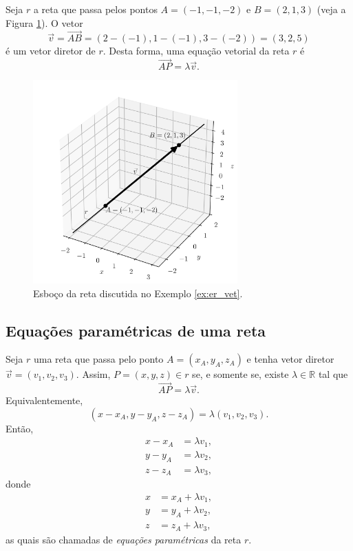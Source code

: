 \begin{ex}\label{ex:er_vet}
  Seja $r$ a reta que passa pelos pontos $A=(-1,-1,-2)$ e $B = (2,1,3)$ (veja a Figura \ref{fig:ex_er_vet}). O vetor
  \begin{equation}
    \vec{v} = \overrightarrow{AB} = (2-(-1),1-(-1),3-(-2)) = (3,2,5)
  \end{equation}
  é um vetor diretor de $r$. Desta forma, uma equação vetorial da reta $r$ é
  \begin{equation}
    \overrightarrow{AP} = \lambda\vec{v}.
  \end{equation}
  \begin{figure}[H]
    \centering
    \includegraphics[width=0.7\textwidth]{./cap_er/dados/fig_ex_er_vet/fig_ex_er_vet}
    \caption{Esboço da reta discutida no Exemplo \ref{ex:er_vet}.}
    \label{fig:ex_er_vet}
  \end{figure}  
\end{ex}

\subsection{Equações paramétricas de uma reta}

Seja $r$ uma reta que passa pelo ponto $A = (x_A,y_A,z_A)$ e tenha vetor diretor $\vec{v} = (v_1,v_2,v_3)$. Assim, $P = (x,y,z)\in r$ se, e somente se, existe $\lambda\in\mathbb{R}$ tal que
\begin{equation}
  \overrightarrow{AP} = \lambda\vec{v}.
\end{equation}
Equivalentemente,
\begin{equation}
  (x-x_A,y-y_A,z-z_A) = \lambda (v_1,v_2,v_3).
\end{equation}
Então,
\begin{align}
  x-x_A &= \lambda v_1,\\
  y-y_A &= \lambda v_2,\\
  z-z_A &= \lambda v_3,
\end{align}
donde
\begin{align}
  x &= x_A + \lambda v_1,\\
  y &= y_A + \lambda v_2,\\
  z &= z_A + \lambda v_3,
\end{align}
as quais são chamadas de \emph{equações paramétricas} da reta $r$.

